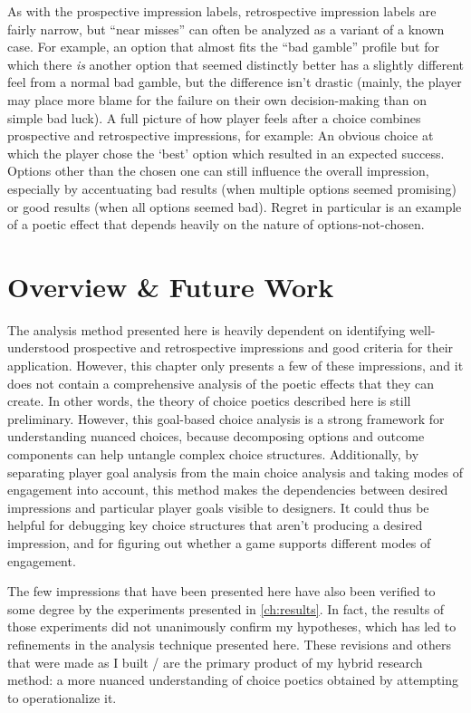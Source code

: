 As with the prospective impression labels, retrospective impression labels are fairly narrow, but ``near misses'' can often be analyzed as a variant of a known case.
%
For example, an option that almost fits the ``bad gamble'' profile but for which there \emph{is} another option that seemed distinctly better has a slightly different feel from a normal bad gamble, but the difference isn't drastic (mainly, the player may place more blame for the failure on their own decision-making than on simple bad luck).
%
A full picture of how player feels after a choice combines prospective and retrospective impressions, for example: An obvious choice at which the player chose the `best' option which resulted in an expected success.
%
Options other than the chosen one can still influence the overall impression, especially by accentuating bad results (when multiple options seemed promising) or good results (when all options seemed bad).
%
Regret in particular is an example of a poetic effect that depends heavily on the nature of options-not-chosen.


\section{Overview \& Future Work}

The analysis method presented here is heavily dependent on identifying well-understood prospective and retrospective impressions and good criteria for their application.
%
However, this chapter only presents a few of these impressions, and it does not contain a comprehensive analysis of the poetic effects that they can create.
%
In other words, the theory of choice poetics described here is still preliminary.
%
However, this goal-based choice analysis is a strong framework for understanding nuanced choices, because decomposing options and outcome components can help untangle complex choice structures.
%
Additionally, by separating player goal analysis from the main choice analysis and taking modes of engagement into account, this method makes the dependencies between desired impressions and particular player goals visible to designers.
%
It could thus be helpful for debugging key choice structures that aren't producing a desired impression, and for figuring out whether a game supports different modes of engagement.


The few impressions that have been presented here have also been verified to some degree by the experiments presented in \cref{ch:results}.
%
In fact, the results of those experiments did not unanimously confirm my hypotheses, which has led to refinements in the analysis technique presented here.
%
These revisions and others that were made as I built \dunyazad/ are the primary product of my hybrid research method: a more nuanced understanding of choice poetics obtained by attempting to operationalize it.


